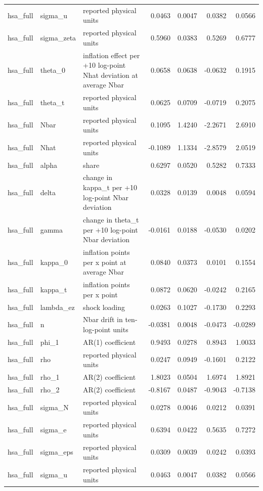 \begin{tabular}{lllrrrr}
hsa\_full & sigma\_u & reported physical units & 0.0463 & 0.0047 & 0.0382 & 0.0566 \\
hsa\_full & sigma\_zeta & reported physical units & 0.5960 & 0.0383 & 0.5269 & 0.6777 \\
hsa\_full & theta\_0 & inflation effect per +10 log-point Nhat deviation at average Nbar & 0.0658 & 0.0638 & -0.0632 & 0.1915 \\
hsa\_full & theta\_t & reported physical units & 0.0625 & 0.0709 & -0.0719 & 0.2075 \\
hsa\_full & Nbar & reported physical units & 0.1095 & 1.4240 & -2.2671 & 2.6910 \\
hsa\_full & Nhat & reported physical units & -0.1089 & 1.1334 & -2.8579 & 2.0519 \\
hsa\_full & alpha & share & 0.6297 & 0.0520 & 0.5282 & 0.7333 \\
hsa\_full & delta & change in kappa\_t per +10 log-point Nbar deviation & 0.0328 & 0.0139 & 0.0048 & 0.0594 \\
hsa\_full & gamma & change in theta\_t per +10 log-point Nbar deviation & -0.0161 & 0.0188 & -0.0530 & 0.0202 \\
hsa\_full & kappa\_0 & inflation points per x point at average Nbar & 0.0840 & 0.0373 & 0.0101 & 0.1554 \\
hsa\_full & kappa\_t & inflation points per x point & 0.0872 & 0.0620 & -0.0242 & 0.2165 \\
hsa\_full & lambda\_ez & shock loading & 0.0263 & 0.1027 & -0.1730 & 0.2293 \\
hsa\_full & n & Nbar drift in ten-log-point units & -0.0381 & 0.0048 & -0.0473 & -0.0289 \\
hsa\_full & phi\_1 & AR(1) coefficient & 0.9493 & 0.0278 & 0.8943 & 1.0033 \\
hsa\_full & rho & reported physical units & 0.0247 & 0.0949 & -0.1601 & 0.2122 \\
hsa\_full & rho\_1 & AR(2) coefficient & 1.8023 & 0.0504 & 1.6974 & 1.8921 \\
hsa\_full & rho\_2 & AR(2) coefficient & -0.8167 & 0.0487 & -0.9043 & -0.7138 \\
hsa\_full & sigma\_N & reported physical units & 0.0278 & 0.0046 & 0.0212 & 0.0391 \\
hsa\_full & sigma\_e & reported physical units & 0.6394 & 0.0422 & 0.5635 & 0.7272 \\
hsa\_full & sigma\_eps & reported physical units & 0.0309 & 0.0039 & 0.0242 & 0.0393 \\
hsa\_full & sigma\_u & reported physical units & 0.0463 & 0.0047 & 0.0382 & 0.0566 \\

\end{tabular}
